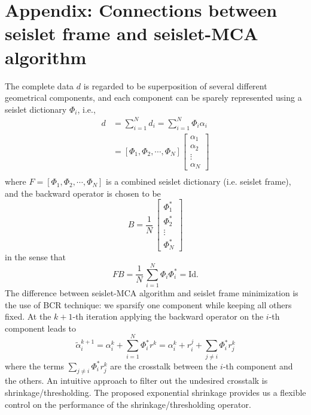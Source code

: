 \appendix
\section{Appendix: Connections between seislet frame and seislet-MCA algorithm}
\label{app:seisletframe}

The complete data $d$ is regarded to be superposition of several different geometrical components, and each component can be sparely represented using a seislet dictionary $\Phi_i$, i.e.,
\begin{equation}
\begin{array}{ll}
  d&=\displaystyle \sum_{i=1}^N d_i=\sum_{i=1}^N \Phi_i \alpha_i\\
  &=[\Phi_1,\Phi_2,\cdots,\Phi_N]\left[\begin{array}{l}
                                        \alpha_1\\
                                        \alpha_2\\
                                        \vdots\\
                                        \alpha_N
                                       \end{array}
\right]\\
\end{array}
\end{equation}
where $F=[\Phi_1,\Phi_2,\cdots,\Phi_N]$ is a combined seislet dictionary (i.e. seislet frame), and the backward operator is chosen to be
\begin{equation}
 B=\frac{1}{N}\,\left[\begin{array}{l}
                \Phi_1^{*}\\
		\Phi_2^{*}\\
                \vdots\\
                \Phi_N^{*}
   \end{array} \right]
\end{equation}
in the sense that
\begin{equation}
 FB=\displaystyle \frac{1}{N}\,\sum_{i=1}^N\Phi_i\Phi_i^{*}=\mathrm{Id}.
\end{equation}
The difference between seislet-MCA algorithm and seislet frame minimization is the use of BCR technique: we sparsify one component while keeping all others fixed.  At the $k+1$-th iteration applying the backward operator on the $i$-th component leads to
\begin{equation}
\tilde{\alpha}_i^{k+1}=\alpha_i^k+\sum_{i=1}^N\Phi_i^{*} r^k=\alpha_i^k+r_i^j+\sum_{j\neq i}\Phi_i^{*} r_j^k
\end{equation}
where the terms $\sum_{j\neq i}\Phi_i^{*}r_j^k$ are the crosstalk between the $i$-th component and the others. An intuitive approach to filter out the undesired crosstalk is shrinkage/thresholding. The proposed exponential shrinkage provides us a flexible control on the performance of the shrinkage/thresholding operator.




